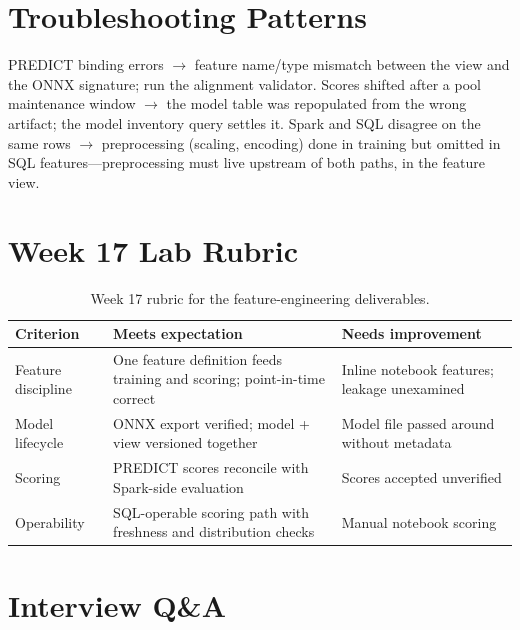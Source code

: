 \section{Troubleshooting Patterns}
PREDICT binding errors $\rightarrow$ feature name/type mismatch between the view and the ONNX signature; run the alignment validator. Scores shifted after a pool maintenance window $\rightarrow$ the model table was repopulated from the wrong artifact; the model inventory query settles it. Spark and SQL disagree on the same rows $\rightarrow$ preprocessing (scaling, encoding) done in training but omitted in SQL features---preprocessing must live upstream of both paths, in the feature view.

\section{Week 17 Lab Rubric}
\begin{table}[H]
\centering
\small
\begin{tabular}{@{}p{3.2cm}p{5.0cm}p{5.0cm}@{}}
\toprule
\textbf{Criterion} & \textbf{Meets expectation} & \textbf{Needs improvement} \\
\midrule
Feature discipline & One feature definition feeds training and scoring; point-in-time correct & Inline notebook features; leakage unexamined \\
Model lifecycle & ONNX export verified; model + view versioned together & Model file passed around without metadata \\
Scoring & PREDICT scores reconcile with Spark-side evaluation & Scores accepted unverified \\
Operability & SQL-operable scoring path with freshness and distribution checks & Manual notebook scoring \\
\bottomrule
\end{tabular}
\caption{Week 17 rubric for the feature-engineering deliverables.}
\label{tab:ch17-rubric}
\end{table}

\section{Interview Q\&A}
